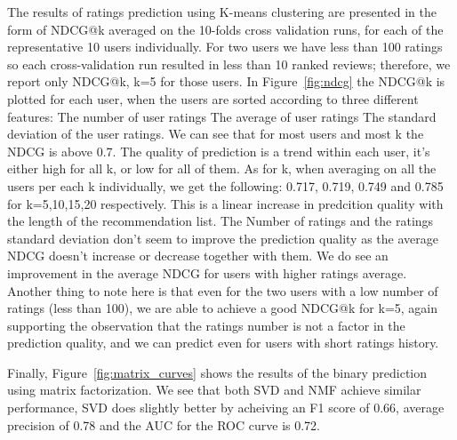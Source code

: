 The results of ratings prediction using K-means clustering are presented in the form of NDCG@k averaged on the 10-folds cross validation runs, for each of the representative 10 users individually. For two users we have less than 100 ratings so each cross-validation run resulted in less than 10 ranked reviews; therefore, we report only NDCG@k, k=5 for those users. In Figure~\ref{fig:ndcg} the NDCG@k is plotted for each user, when the users are sorted according to three different features: \blackone The number of user ratings \blacktwo The average of user ratings \blackthree The standard deviation of the user ratings. We can see that for most users and most k the NDCG is above 0.7. The quality of prediction is a trend within each user, it's either high for all k, or low for all of them. As for k, when averaging on all the users per each k individually, we get the following: 0.717, 0.719, 0.749 and 0.785 for k=5,10,15,20 respectively. This is a linear increase in predcition quality with the length of the recommendation list. The Number of ratings and the ratings standard deviation don't seem to improve the prediction quality as the average NDCG doesn't increase or decrease together with them. We do see an improvement in the average NDCG for users with higher ratings average. Another thing to note here is that even for the two users with a low number of ratings (less than 100), we are able to achieve a good NDCG@k for k=5, again supporting the observation that the ratings number is not a factor in the prediction quality, and we can predict even for users with short ratings history. 


Finally, Figure~\ref{fig:matrix_curves} shows the results of the binary prediction using matrix factorization. 
We see that both SVD and NMF achieve similar performance, SVD does slightly better by acheiving an F1 score of 0.66, average precision of 0.78 and the AUC for the ROC curve is 0.72.
